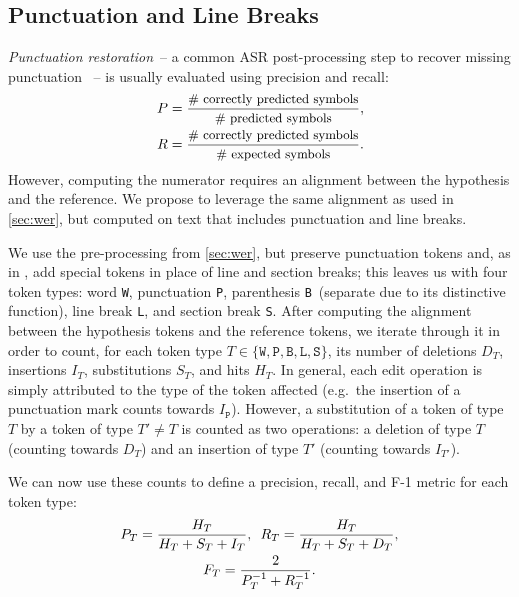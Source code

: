 \documentclass{article}
\newcommand{\punct}{\texttt{P}} \newcommand{\paren}{\texttt{B}} \newcommand{\nl}{\texttt{L}} \newcommand{\sect}{\texttt{S}}
\begin{document}
\subsection{Punctuation and Line Breaks}
\emph{Punctuation restoration}~-- a common ASR post-pro\-cess\-ing step to recover missing punctuation \cite{pais-2022-capitalization}~-- is usually evaluated using precision and recall:
\begin{equation}
    \begin{gathered}
    P = \frac{\text{\small\# correctly predicted symbols}}{\text{\small\# predicted symbols}},\\
    R = \frac{\text{\small\# correctly predicted symbols}}{\text{\small\# expected symbols}}.
    \end{gathered}
\end{equation}
However, computing the numerator requires an alignment between the hypothesis and the reference.
We propose to leverage the same alignment as used in \cref{sec:wer}, but computed on text that includes punctuation and line breaks.

We use the pre-processing from \cref{sec:wer}, but preserve punctuation tokens and, as in \cite{matusov-etal-2019-customizing,karakanta-etal-2020-42}, add special tokens in place of line and section breaks; this leaves us with four token types: word \texttt{W}, punctuation \punct, parenthesis \paren\ (separate due to its distinctive function), line break \nl, and section break \sect.
After computing the alignment between the hypothesis tokens and the reference tokens, we iterate through it in order to count, for each token type $T\in\{\texttt{W},\punct,\paren,\nl,\sect\}$, its number of deletions $D_T$, insertions $I_T$, substitutions $S_T$, and hits $H_T$.
In general, each edit operation is simply attributed to the type of the token affected (e.g.\ the insertion of a punctuation mark counts towards $I_\punct$).
However, a substitution of a token of type $T$ by a token of type $T'\neq T$ is counted as two operations: a deletion of type $T$ (counting towards $D_T$) and an insertion of type $T'$ (counting towards $I_{T'}$).

We can now use these counts to define a precision, recall, and F-1 metric for each token type:
\begin{equation}
    \begin{gathered}
    P_T = \frac{H_T}{H_T+S_T+I_T}, \hskip0.5em\relax R_T = \frac{H_T}{H_T+S_T+D_T},\\
    F_T = \frac{2}{P_T^{-1}+R_T^{-1}}.
\end{gathered}
\end{equation}
\end{document}
